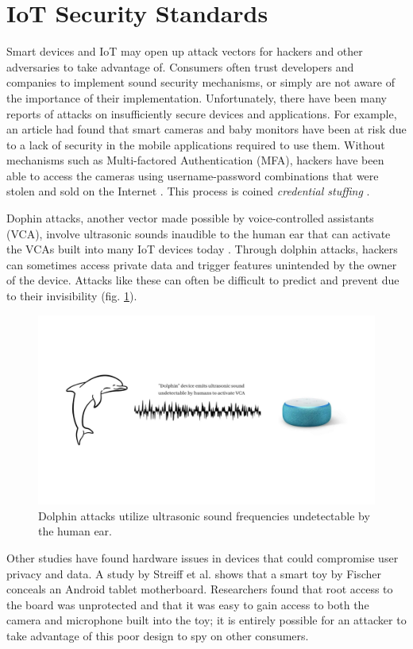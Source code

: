 \documentclass[12pt]{ucthesis}
\begin{document}
\section{IoT Security Standards}
Smart devices and IoT may open up attack vectors for hackers and other adversaries to take advantage of. Consumers often trust developers and companies to implement sound security mechanisms, or simply are not aware of the importance of their implementation. Unfortunately, there have been many reports of attacks on insufficiently secure devices and applications. For example, an article had found that smart cameras and baby monitors have been at risk due to a lack of security in the mobile applications required to use them. Without mechanisms such as Multi-factored Authentication (MFA), hackers have been able to access the cameras using username-password combinations that were stolen and sold on the Internet \cite{wp:camera}. This process is coined \textit{credential stuffing} \cite{stuffing}.

Dophin attacks, another vector made possible by voice-controlled assistants (VCA), involve ultrasonic sounds inaudible to the human ear that can activate the VCAs built into many IoT devices today \cite{dolphin}. Through dolphin attacks, hackers can sometimes access private data and trigger features unintended by the owner of the device. Attacks like these can often be difficult to predict and prevent due to their invisibility (fig. \ref{fig:dolphin}).

\begin{figure}
    \centering
    \includegraphics[width=\textwidth]{dolphinattack.jpg}
    \caption{Dolphin attacks utilize ultrasonic sound frequencies undetectable by the human ear.}
    \label{fig:dolphin}
\end{figure}

Other studies have found hardware issues in devices that could compromise user privacy and data. A study by Streiff et al. \cite{streiff:overpowered} shows that a smart toy by Fischer conceals an Android tablet motherboard. Researchers found that root access to the board was unprotected and that it was easy to gain access to both the camera and microphone built into the toy; it is entirely possible for an attacker to take advantage of this poor design to spy on other consumers.
\end{document}

